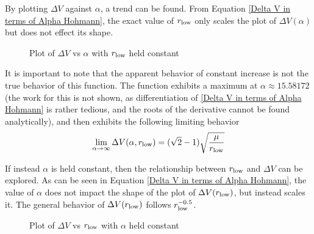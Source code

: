 \documentclass[../basicOrbitalDynamics.tex]{subfiles}
\begin{document}
By plotting $\Delta V$ against $\alpha$, a trend can be found. From Equation  \eqref{Delta V in terms of Alpha Hohmann}, the exact value of ${r}_\text{low}$ only scales the plot of $\Delta V(\alpha)$ but does not effect its shape.
\begin{figure}[H]
    \centering
    \def\rootMuOverR{5}
    \caption{Plot of $\Delta V$ vs $\alpha$ with ${r}_\text{low}$ held constant}\label{fig:Hohmann Delta V r1 const}
\end{figure}

It is important to note that the apparent behavior of constant increase is not the true behavior of this function. The function exhibits a maximum at $\alpha\approx15.58172$ (the work for this is not shown, as differentiation of  \eqref{Delta V in terms of Alpha Hohmann} is rather tedious, and the roots of the derivative cannot be found analytically), and then exhibits the following limiting behavior
\[\lim_{\alpha\rightarrow\infty}\Delta V(\alpha, {r}_\text{low})=(\sqrt{2}-1)\sqrt{\frac{\mu}{{r}_\text{low}}}\]

If instead $\alpha$ is held constant, then the relationship between ${r}_\text{low}$ and $\Delta V$ can be explored. As can be seen in Equation  \eqref{Delta V in terms of Alpha Hohmann}, the value of $\alpha$ does not impact the shape of the plot of $\Delta V({r}_\text{low})$, but instead scales it. The general behavior of $\Delta V({r}_\text{low})$ follows ${r}_\text{low}^{-0.5}$.

\begin{figure}[H]
    \centering
    \def\multBy{1.25}
    \caption{Plot of $\Delta V$ vs ${r}_\text{low}$ with $\alpha$ held constant}\label{fig:Hohmann Delta V alpha const}
\end{figure}
\end{document}
